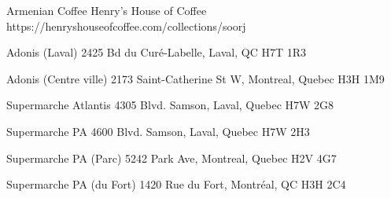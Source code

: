 Armenian Coffee
Henry's House of Coffee
https://henryshouseofcoffee.com/collections/soorj

Adonis (Laval)
2425 Bd du Curé-Labelle, Laval, QC H7T 1R3

Adonis (Centre ville)
2173 Saint-Catherine St W, Montreal, Quebec H3H 1M9

Supermarche Atlantis
4305 Blvd. Samson, Laval, Quebec H7W 2G8

Supermarche PA
4600 Blvd. Samson, Laval, Quebec H7W 2H3

Supermarche PA (Parc)
5242 Park Ave, Montreal, Quebec H2V 4G7

Supermarche PA (du Fort)
1420 Rue du Fort, Montréal, QC H3H 2C4